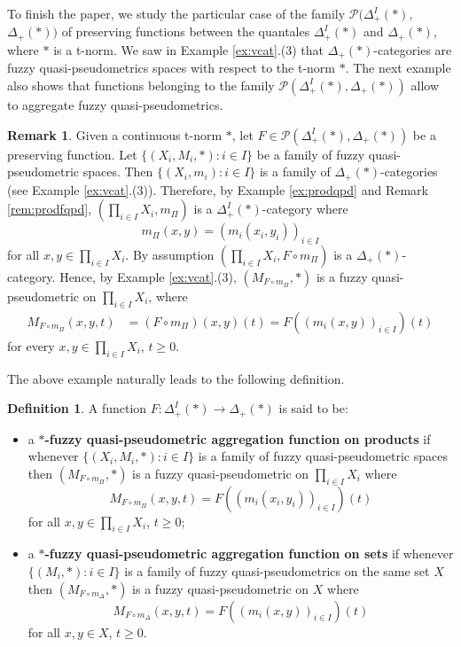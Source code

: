 \documentclass[11pt,a4paper]{amsart}
\theoremstyle{definition}
\newtheorem{definition}[theorem]{Definition}
\newtheorem{remark}[theorem]{Remark}
\begin{document}
	
	To finish the paper, we study the particular case of the family $\mathscr{P}(\Delta^I_+(\ast),$ $\Delta_+(\ast))$ of preserving functions between the quantales $\Delta^I_+(\ast)$ and $\Delta_+(\ast)$, where $\ast$ is a t-norm. We saw in Example \ref{ex:vcat}.(3) that $\Delta_+(\ast)$-categories are fuzzy quasi-pseudometrics spaces with respect to the t-norm $\ast.$ The next example also shows that functions belonging to the family $\mathscr{P}(\Delta^I_+(\ast),\Delta_+(\ast))$ allow to aggregate fuzzy quasi-pseudometrics.
	
	\begin{remark}\label{rem:preserving-fqpmafp}
		Given a continuous t-norm $\ast$, let $F\in\mathscr{P}(\Delta_+^I(\ast), \Delta_+(\ast))$ be a preserving function. Let $\big\{(X_i,M_i,\ast):i\in I\big\}$ be a family of fuzzy quasi-pseudometric spaces. Then $\big\{(X_i,m_i):i\in I\big\}$ is a family of $\Delta_+(\ast)$-categories (see Example \ref{ex:vcat}.(3)). Therefore, by Example \ref{ex:prodqpd} and Remark \ref{rem:prodfqpd}, $(\prod_{i\in I} X_i,m_\Pi)$ is a $\mathsf{\Delta}_+^I(\ast)$-category where
		$$m_\Pi(x,y)=(m_i(x_i,y_i))_{i\in I}$$ for all $x,y\in \prod_{i\in I}X_i.$
		By assumption $(\prod_{i\in I} X_i, F\circ m_\Pi) $ is a $\Delta_+(\ast)$-category. Hence, by Example \ref{ex:vcat}.(3), $(M_{F\circ m_\Pi},\ast)$ is a fuzzy quasi-pseudometric on $\prod_{i\in I}X_i$, where
		\begin{align*}
			M_{F\circ m_\Pi}(x,y,t)&=(F\circ m_\Pi)(x,y)(t)=F((m_i(x,y))_{i\in I})(t)
		\end{align*}
		for every $x,y\in\prod_{i\in I}X_i$, $t\geq 0.$ 
	\end{remark}
	
	The above example naturally leads to the following definition.
	
	\begin{definition}\label{def:fqpmaf_quantale}
		A function $F:\Delta_+^I(\ast)\to \Delta_+(\ast)$ is said to be:
		\begin{itemize}
			\item a \textbf{$\ast$-fuzzy quasi-pseudometric aggregation function on products} if  whenever $\Big\{(X_i,M_i,\ast):i\in I\Big\}$ is a family of fuzzy quasi-pseudometric spaces then $(M_{F\circ m_\Pi},\ast)$ is a fuzzy quasi-pseudometric on $\prod_{i\in I}X_i$ where
			$$M_{F\circ m_\Pi}(x,y,t)=F((m_i(x_i,y_i))_{i\in I})(t)$$
			for all $x,y\in \prod_{i\in I}X_i$, $t\geq 0;$
			\item a \textbf{$\ast$-fuzzy quasi-pseudometric aggregation function on sets} if whenever  $\Big\{(M_i,\ast):i\in I\Big\}$ is a family of fuzzy quasi-pseudometrics on the same set $X$ then $(M_{F\circ m_\Delta},\ast)$ is a fuzzy quasi-pseudometric on $X$ where  
			$$M_{F\circ m_\Delta}(x,y,t)=F((m_i(x,y))_{i\in I})(t)$$
			for all $x,y\in X$, $t\geq 0.$
		\end{itemize}
	\end{definition}
	
\end{document}
